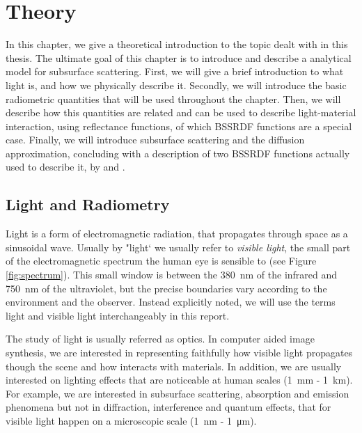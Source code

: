 \chapter{Theory}

In this chapter, we give a theoretical introduction to the topic dealt with in this thesis. The ultimate goal of this chapter is to introduce and describe a analytical model for subsurface scattering. First, we will give a brief introduction to what light is, and how we physically describe it. Secondly, we will introduce the basic radiometric quantities that will be used throughout the chapter. Then, we will describe how this quantities are related and can be used to describe light-material interaction, using reflectance functions, of which BSSRDF functions are a special case. Finally, we will introduce subsurface scattering and the diffusion approximation, concluding with a description of two BSSRDF functions actually used to describe it, by \cite{Jensen:2001:PMS:383259.383319} and \cite{IMM2013-06646}.

\section{Light and Radiometry}
Light is a form of electromagnetic radiation, that propagates through space as a sinusoidal wave. Usually by "light` we usually refer to \emph{visible light}, the small part of the electromagnetic spectrum the human eye is sensible to (see Figure \ref{fig:spectrum}). This small window is between the \SI{380}{\nano\meter} of the infrared and \SI{750}{\nano\meter} of the ultraviolet, but the precise boundaries vary according to the environment and the observer. Instead explicitly noted, we will use the terms light and visible light interchangeably in this report.

The study of light is usually referred as optics. In computer aided image synthesis, we are interested in representing faithfully how visible light propagates though the scene and how interacts with materials. In addition, we are usually interested on lighting effects that are noticeable at human scales (\SI{1}{\milli\meter} - \SI{1}{\kilo\meter}). For example, we are interested in subsurface scattering, absorption and emission phenomena but not in diffraction, interference and quantum effects, that for visible light happen on a microscopic scale (\SI{1}{\nano\meter} - \SI{1}{\micro\meter}). 

